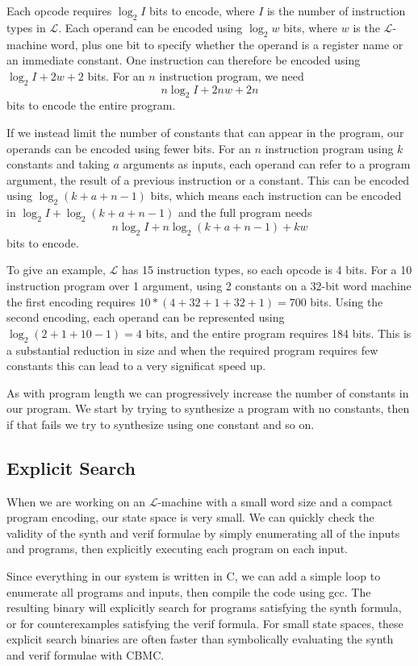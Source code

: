 \documentclass[a4paper]{llncs}
\begin{document}
Each opcode requires $\log_2 I$ bits to encode, where $I$ is the number
of instruction types in $\mathcal{L}$.  Each operand can be encoded using
$\log_2 w$ bits, where $w$ is the $\mathcal{L}$-machine word, plus one
bit to specify whether the operand is a register name or an immediate constant.
One instruction can therefore be encoded using $\log_2 I + 2w + 2$ bits.
For an $n$ instruction program, we need $$n \log_2 I + 2nw + 2n$$ bits to encode
the entire program.

If we instead limit the number of constants that can appear in the program,
our operands can be encoded using fewer bits.  For an $n$ instruction program
using $k$ constants and taking $a$ arguments as inputs, each operand can refer
to a program argument, the result of a previous instruction or a constant.
This can be encoded using $\log_2 (k+a+n-1)$ bits, which means each instruction
can be encoded in $\log_2 I + \log_2 (k + a + n - 1)$ and the full program
needs $$n \log_2 I + n \log_2 (k + a + n - 1) + kw$$ bits to encode.

To give an example, $\mathcal{L}$ has 15 instruction types, so each opcode is 4 bits.
For a 10 instruction program over 1 argument, using 2 constants on a 32-bit word
machine the first encoding requires $10 * (4 + 32 + 1 + 32 + 1) = 700$ bits.
Using the second encoding, each operand can be represented using
$\log_2 (2 + 1 + 10 - 1) = 4$ bits, and the entire program requires 184 bits.
This is a substantial reduction in size and when the required program requires
few constants this can lead to a very significat speed up.

As with program length we can progressively increase the number of constants in
our program.  We start by trying to synthesize a program with no constants, then
if that fails we try to synthesize using one constant and so on.

\subsection{Explicit Search}

When we are working on an $\mathcal{L}$-machine with a small word size and
a compact program encoding, our state space is very small.
We can quickly check the validity of the {\sc synth} and {\sc verif} formulae
by simply enumerating all of the inputs and programs, then explicitly
executing each program on each input.

Since everything in our system is written in C, we can add a simple loop
to enumerate all programs and inputs, then compile the code using {\sc gcc}.
The resulting binary will explicitly search for programs satisfying the {\sc synth}
formula, or for counterexamples satisfying the {\sc verif} formula.
For small state spaces, these explicit search binaries are often faster
than symbolically evaluating the {\sc synth} and {\sc verif} formulae with
{\sc CBMC}.
\end{document}
